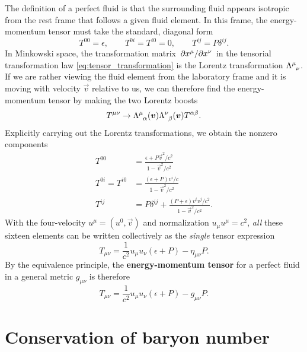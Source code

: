The definition of a perfect fluid is that the surrounding fluid appears isotropic from the rest frame that follows a given fluid element.
In this frame, the energy-momentum tensor must take the standard, diagonal form
\begin{equation}
	T^{00} = \epsilon , \qquad
	T^{0i} = T^{i0} = 0 , \qquad
	T^{ij} = P \delta^{ij} .
\end{equation}
In Minkowski space, the transformation matrix $\pdv{x^\mu}/{x^\nu}$ in the tensorial transformation law \eqref{eq:tensor_transformation} is the Lorentz transformation $\Lambda\indices{^\mu_\nu}$. \cite{ref:mika_gr_notes}
If we are rather viewing the fluid element from the laboratory frame and it is moving with velocity $\vec{v}$ relative to us, we can therefore find the energy-momentum tensor by making the two Lorentz boosts
\begin{equation}
	T^{\mu \nu} \rightarrow \Lambda\indices{^\mu_\alpha}(\vec{v}) \Lambda\indices{^\nu_\beta}(\vec{v}) T^{\alpha \beta} .
\end{equation}
Explicitly carrying out the Lorentz transformations, we obtain the nonzero components
\begin{subequations}
\begin{align}
	T^{00} &= \frac{\epsilon + P \vec{v}^2 / c^2}{1 - \vec{v}^2 / c^2} \\
	T^{0i} = T^{i0} &= \frac{(\epsilon + P) v^i / c}{1 - \vec{v}^2 / c^2} \\
	T^{ij} &= P \delta^{ij} + \frac{(P + \epsilon) v^i v^j / c^2}{1 - \vec{v}^2 / c^2} .
\end{align}
\end{subequations}
With the four-velocity $u^\mu = (u^0, \vec{v})$ and normalization $u_\mu u^\mu = c^2$, \emph{all} these sixteen elements can be written collectively as the \emph{single} tensor expression
\begin{equation}
	T_{\mu \nu} = \frac{1}{c^2} u_\mu u_\nu (\epsilon + P) - \eta_{\mu \nu} P .
\end{equation}
By the equivalence principle, the \textbf{energy-momentum tensor} for a perfect fluid in a general metric $g_{\mu \nu}$ is therefore
\begin{equation}
	T_{\mu \nu} = \frac{1}{c^2} u_\mu u_\nu (\epsilon + P) - g_{\mu \nu} P .
\label{eq:relfluid:energy_momentum}
\end{equation}

\section{Conservation of baryon number}

